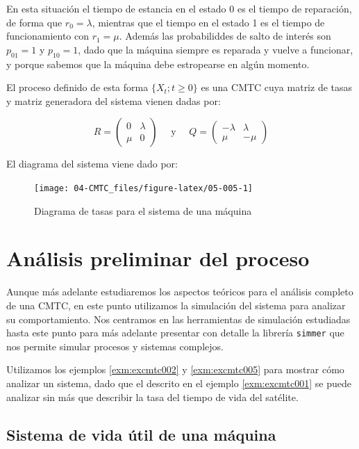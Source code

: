 \documentclass[
]{book}
\theoremstyle{definition}
\theoremstyle{definition}
\theoremstyle{definition}
\theoremstyle{definition}
\theoremstyle{remark}
\begin{document}
En esta situación el tiempo de estancia en el estado 0 es el tiempo de reparación, de forma que \(r_0 = \lambda\), mientras que el tiempo en el estado 1 es el tiempo de funcionamiento con \(r_1 = \mu\). Además las probabiliddes de salto de interés son \(p_{01} = 1\) y \(p_{10} = 1\), dado que la máquina siempre es reparada y vuelve a funcionar, y porque sabemos que la máquina debe estropearse en algún momento.

El proceso definido de esta forma \(\{X_t; t \geq 0\}\) es una CMTC cuya matriz de tasas y matriz generadora del sistema vienen dadas por:

\[R = 
\begin{pmatrix}
0 & \lambda \\
\mu & 0
\end{pmatrix} \quad \text{ y } \quad Q = 
\begin{pmatrix}
-\lambda & \lambda \\
\mu & -\mu
\end{pmatrix}\]

El diagrama del sistema viene dado por:

\begin{figure}

{\centering \texttt{[image: 04-CMTC\_files/figure-latex/05-005-1]} 

}

\caption{Diagrama de tasas para el sistema de una máquina}\label{fig:05-005}
\end{figure}

\hypertarget{CMTCC}{%
\section{Análisis preliminar del proceso}\label{CMTCC}}

Aunque más adelante estudiaremos los aspectos teóricos para el análisis completo de una CMTC, en este punto utilizamos la simulación del sistema para analizar su comportamiento. Nos centramos en las herramientas de simulación estudiadas hasta este punto para más adelante presentar con detalle la librería \texttt{simmer} que nos permite simular procesos y sistemas complejos.

Utilizamos los ejemplos \ref{exm:excmtc002} y \ref{exm:excmtc005} para mostrar cómo analizar un sistema, dado que el descrito en el ejemplo \ref{exm:excmtc001} se puede analizar sin más que describir la tasa del tiempo de vida del satélite.

\hypertarget{sistema-de-vida-uxfatil-de-una-muxe1quina}{%
\subsection{Sistema de vida útil de una máquina}\label{sistema-de-vida-uxfatil-de-una-muxe1quina}}
\end{document}
